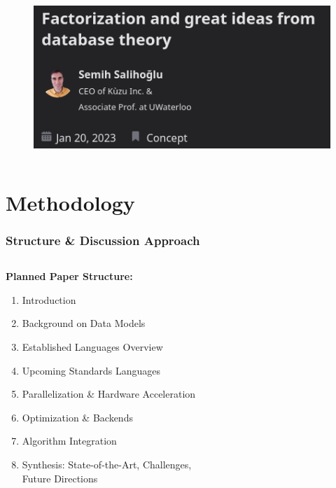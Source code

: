 \documentclass[
	aspectratio=169,
	compress,
]{beamer}
\newcommand{\navframetitle}[1]{\frametitle{#1\hfill{\footnotesize\lastsection{}}}}
\begin{document}
\begin{frame}
\begin{columns}[T]
\begin{column}{0.3\textwidth}
            \begin{figure}
                \caption{\cite{kuzudbFactorization}}
                \begin{center}
                    \includegraphics[width=\textwidth]{./figures/kuzuFactorization.png}
                \end{center}
            \end{figure}
        \end{column}
    \end{columns}
\end{frame}

\section{Methodology}
\label{sec:methodology}

\begin{frame}
	\navframetitle{Structure \& Discussion Approach}

	\begin{columns}[T]
		\begin{column}{0.5\textwidth}
			\textbf{Planned Paper Structure:}
			\begin{enumerate}
                \item Introduction
                \item Background on Data Models
                \item Established Languages Overview
                \item Upcoming Standards Languages
                \item Parallelization \& Hardware Acceleration
                \item \textcolor{ovgu-lightgray}{Optimization \& Backends}
                \item Algorithm Integration
                \item Synthesis: State-of-the-Art, Challenges,\\\hspace{4.3em} Future Directions
			\end{enumerate}
		\end{column}
		\begin{column}{0.5\textwidth}
		\end{column}
	\end{columns}

\end{frame}
\end{document}
